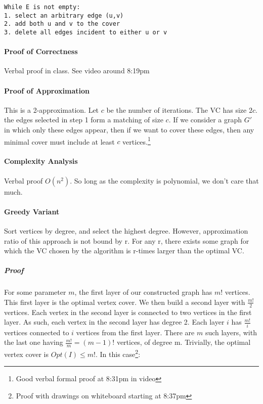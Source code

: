 \documentclass[a4paper]{article}
\begin{document}
\begin{lstlisting}[frame=L]
While E is not empty:
1. select an arbitrary edge (u,v)
2. add both u and v to the cover
3. delete all edges incident to either u or v
\end{lstlisting}

\paragraph{Proof of Correctness}
Verbal proof in class. See video around 8:19pm

\paragraph{Proof of Approximation}
This is a 2-approximation. Let $c$ be the number of iterations. The VC has size $2c$. the edges selected in step 1 form a matching of size $c$. If we consider a graph $G'$ in which only these edges appear, then if we want to cover these edges, then any minimal cover must include at least $c$ vertices.\footnote{Good verbal formal proof at 8:31pm in video}

\paragraph{Complexity Analysis}
Verbal proof $O(n^2)$. So long as the complexity is polynomial, we don't care that much.

\paragraph{Greedy Variant}
Sort vertices by degree, and select the highest degree. However, approximation ratio of this approach is not bound by r. For any r, there exists some graph for which the VC chosen by the algorithm is r-times larger than the optimal VC.

\subparagraph{Proof}
For some parameter $m$, the first layer of our constructed graph has $m!$ vertices. This first layer is the optimal vertex cover. We then build a second layer with $\frac{m!}{2}$ vertices. Each vertex in the second layer is connected to two vertices in the first layer. As such, each vertex in the second layer has degree 2. Each layer $i$ has $\frac{m!}{i}$ vertices connected to $i$ vertices from the first layer. There are $m$ such layers, with the last one having $\frac{m!}{m}=(m-1)!$ vertices, of degree m. Trivially, the optimal vertex cover is $Opt(I) \le m!$. In this case\footnote{Proof with drawings on whiteboard starting at 8:37pm}: 
\end{document}
